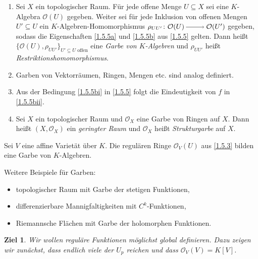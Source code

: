 \documentclass[a4paper,12pt,index=toc]{scrbook}
\theoremstyle{keinenummern} %
\newtheorem{ziel}{Ziel}
\def\O{\mathcal{O}}
\begin{document}
\begin{dfn}\label{1.5.6}
  \begin{enumerate}
  \item Sei $X$ ein topologischer Raum. Für jede offene Menge $U\subseteq X$ sei eine $K$-Algebra $\O(U)$ gegeben. Weiter sei
    für jede Inklusion von offenen Mengen $U'\subseteq U$ ein $K$-Algebren-Homomorphismus $\rho_{UU'}\colon\O(U)\ra\O(U')$
    gegeben, sodass die Eigenschaften \ref{1.5.5a} und \ref{1.5.5b} aus \cref{1.5.5} gelten. Dann heißt
    $\{\O(U),\rho_{UU'}\}_{U'\subseteq U\text{ offen}}$ eine \emph{Garbe von $K$-Algebren} und $\rho_{UU'}$ heißt
    \emph{Restriktionshomomorphismus}.
  \item Garben von Vektorräumen, Ringen, Mengen etc. sind analog definiert.
  \item Aus der Bedingung \ref{1.5.5bi} in \cref{1.5.5} folgt die Eindeutigkeit von $f$ in \ref{1.5.5bii}.
  \item Sei $X$ ein topologischer Raum und $\O_X$ eine Garbe von Ringen auf $X$. Dann heißt $(X,\O_X)$ ein \emph{geringter Raum}
    und $\O_X$ heißt \emph{Strukturgarbe} auf $X$.
  \end{enumerate}
\end{dfn}

\begin{bem}\label{1.5.7}
  Sei $V$ eine affine Varietät über $K$. Die regulären Ringe $\O_V(U)$ aus \cref{1.5.3} bilden eine Garbe von $K$-Algebren.
\end{bem}

\begin{bsp}\label{1.5.8}
  Weitere Beispiele für Garben:
  \begin{itemize}
  \item topologischer Raum mit Garbe der stetigen Funktionen,
  \item differenzierbare Mannigfaltigkeiten mit $C^k$-Funktionen,
  \item Riemannsche Flächen mit Garbe der holomorphen Funktionen.
  \end{itemize}
\end{bsp}

\begin{ziel} Wir wollen reguläre Funktionen möglichst global definieren.
Dazu zeigen wir zunächst, dass endlich viele der $U_p$ reichen
und dass $\O_V(V)=K[V]$.
\end{ziel}
\end{document}
